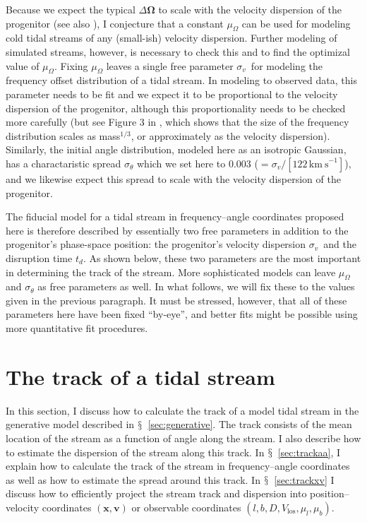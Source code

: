 \documentclass[12pt,preprint]{aastex}
\newcommand{\sectionname}{$\mathsection$}
\renewcommand{\vec}[1]{\ensuremath{\mathbf{#1}}}
\newcommand{\vecx}{\ensuremath{\vec{x}}}
\newcommand{\vecv}{\ensuremath{\vec{v}}}
\newcommand{\veco}{\ensuremath{\vec{\Omega}}}
\newcommand{\sigv}{\ensuremath{\sigma_v}}
\newcommand{\kms}{\ensuremath{\,\mathrm{km\ s}^{-1}}}
\newcommand{\vlos}{\ensuremath{V_{\mathrm{los}}}}
\newcommand{\pmll}{\ensuremath{\mu_l}}
\newcommand{\pmbb}{\ensuremath{\mu_b}}
\begin{document}
Because we expect the typical $\Delta\veco$ to scale with the
velocity dispersion of the progenitor (see also \citealt{Sanders13a}),
I conjecture that a constant $\mu_\Omega$ can be used for modeling
cold tidal streams of any (small-ish) velocity dispersion. Further
modeling of simulated streams, however, is necessary to check this and
to find the optimizal value of $\mu_\Omega$. Fixing $\mu_\Omega$
leaves a single free parameter \sigv\ for modeling the frequency
offset distribution of a tidal stream. In modeling to observed data,
this parameter needs to be fit and we expect it to be proportional to
the velocity dispersion of the progenitor, although this
proportionality needs to be checked more carefully (but see Figure 3
in \citealt{Sanders13a}, which shows that the size of the frequency
distribution scales as mass$^{1/3}$, or approximately as the velocity
dispersion). Similarly, the initial angle distribution, modeled here
as an isotropic Gaussian, has a charactaristic spread $\sigma_{\theta}$
which we set here to $0.003$ ($=\sigv/[122\kms]$), and we likewise
expect this spread to scale with the velocity dispersion of the
progenitor.

The fiducial model for a tidal stream in frequency--angle coordinates
proposed here is therefore described by essentially two free
parameters in addition to the progenitor's phase-space position: the
progenitor's velocity dispersion \sigv\ and the disruption time
$t_d$. As shown below, these two parameters are the most important in
determining the track of the stream. More sophisticated models can
leave $\mu_\Omega$ and $\sigma_{\theta}$ as free parameters as
well. In what follows, we will fix these to the values given in the
previous paragraph. It must be stressed, however, that all of these
parameters here have been fixed ``by-eye'', and better fits might be
possible using more quantitative fit procedures.


\section{The track of a tidal stream}\label{sec:track}

In this section, I discuss how to calculate the track of a model tidal
stream in the generative model described in
\sectionname~\ref{sec:generative}. The track consists of the mean
location of the stream as a function of angle along the stream. I also
describe how to estimate the dispersion of the stream along this
track. In \sectionname~\ref{sec:trackaa}, I explain how to calculate
the track of the stream in frequency--angle coordinates as well as how
to estimate the spread around this track. In
\sectionname~\ref{sec:trackxv} I discuss how to efficiently project
the stream track and dispersion into position--velocity coordinates
$(\vecx,\vecv)$ or observable coordinates $(l,b,D,\vlos,\pmll,\pmbb)$.
\end{document}
